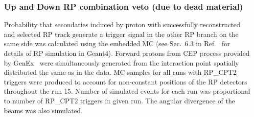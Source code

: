 % 


\subsubsection{Up and Down RP combination veto (due to dead material)}\label{sec:rpDeadMat}

Probability that secondaries induced by proton with successfully reconstructed and selected RP track generate a trigger signal in the other RP branch on the same side was calculated using the embedded MC (see Sec.~6.3 in Ref.~\cite{supplementaryNote} for details of RP simulation in Geant4). Forward protons from CEP process provided by GenEx~\cite{GenEx} were simultaneously generated from the interaction point spatially distributed the same as in the data. MC samples for all runs with RP\_CPT2 triggers were produced to account for non-constant positions of the RP detectors throughout the run 15. Number of simulated events for each run was proportional to number of RP\_CPT2 triggers in given run. The angular divergence of the beams was also simulated.

